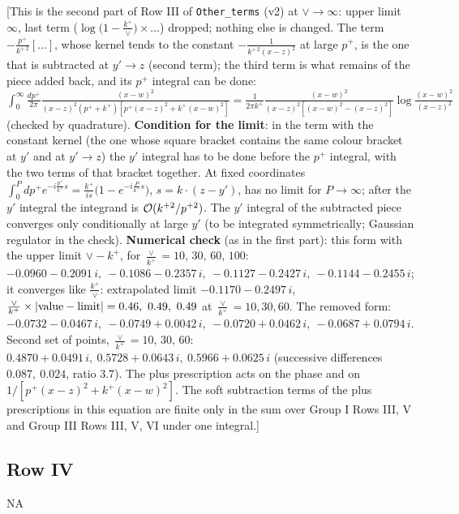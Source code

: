 \documentclass[9pt]{article}
\numberwithin{equation}{section}
\begin{document}
{\color{red}[This is the second part of Row III of \texttt{Other\_terms} (v2) at $\vee\to\infty$: upper limit $\infty$, last term ($\log\big(1-\frac{k^{+}}{\vee}\big)\times\dots$) dropped; nothing else is changed. The term $-\frac{p^{+}}{k^{+\,2}}[\dots]$, whose kernel tends to the constant $-\frac{1}{k^{+\,2}(x-z)^{2}}$ at large $p^{+}$, is the one that is subtracted at $y'\to z$ (second term); the third term is what remains of the piece added back, and its $p^{+}$ integral can be done: $\int_{0}^{\infty}\frac{dp^{+}}{2\pi}\frac{(x-w)^{2}}{(x-z)^{2}(p^{+}+k^{+})[p^{+}(x-z)^{2}+k^{+}(x-w)^{2}]}=\frac{1}{2\pi k^{+}}\frac{(x-w)^{2}}{(x-z)^{2}[(x-w)^{2}-(x-z)^{2}]}\log\frac{(x-w)^{2}}{(x-z)^{2}}$ (checked by quadrature). \textbf{Condition for the limit}: in the term with the constant kernel (the one whose square bracket contains the same colour bracket at $y'$ and at $y'\to z$) the $y'$ integral has to be done before the $p^{+}$ integral, with the two terms of that bracket together. At fixed coordinates $\int_{0}^{P}dp^{+}e^{-i\frac{p^{+}}{k^{+}}s}=\frac{k^{+}}{is}\big(1-e^{-i\frac{P}{k^{+}}s}\big)$, $s=k\cdot(z-y')$, has no limit for $P\to\infty$; after the $y'$ integral the integrand is ${\cal O}(k^{+2}/p^{+2})$. The $y'$ integral of the subtracted piece converges only conditionally at large $y'$ (to be integrated symmetrically; Gaussian regulator in the check). \textbf{Numerical check} (as in the first part): this form with the upper limit $\vee-k^{+}$, for $\frac{\vee}{k^{+}}=10,\,30,\,60,\,100$: $-0.0960-0.2091\,i,\ -0.1086-0.2357\,i,\ -0.1127-0.2427\,i,\ -0.1144-0.2455\,i$; it converges like $\frac{k^{+}}{\vee}$: extrapolated limit $-0.1170-0.2497\,i$, $\frac{\vee}{k^{+}}\times|{\rm value}-{\rm limit}|=0.46,\ 0.49,\ 0.49$ at $\frac{\vee}{k^{+}}=10,30,60$. The removed form: $-0.0732-0.0467\,i,\ -0.0749+0.0042\,i,\ -0.0720+0.0462\,i,\ -0.0687+0.0794\,i$. Second set of points, $\frac{\vee}{k^{+}}=10,\,30,\,60$: $0.4870+0.0491\,i,\ 0.5728+0.0643\,i,\ 0.5966+0.0625\,i$ (successive differences $0.087,\ 0.024$, ratio $3.7$). The plus prescription acts on the phase and on $1/[p^{+}(x-z)^{2}+k^{+}(x-w)^{2}]$. The soft subtraction terms of the plus prescriptions in this equation are finite only in the sum over Group I Rows III, V and Group III Rows III, V, VI under one integral.]}\par\noindent
\subsection{Row IV}
\textsc{NA}
\end{document}
